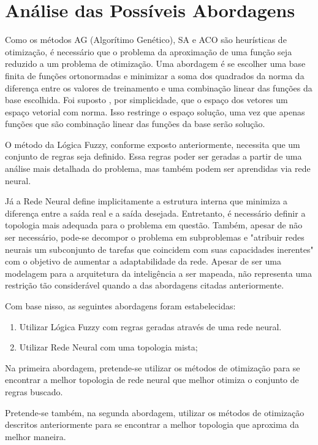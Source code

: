 \chapter{Análise das Possíveis Abordagens}

Como os métodos AG (Algorítimo Genético),
SA e ACO são heurísticas de otimização, é necessário que o problema da aproximação
de uma função seja reduzido a um problema de otimização. Uma abordagem é se escolher uma
base finita de funções ortonormadas e minimizar a soma dos quadrados da norma da diferença
entre os valores de treinamento e uma combinação linear das funções da base escolhida. Foi suposto
, por simplicidade, que o espaço dos vetores um espaço vetorial com norma. Isso restringe o
espaço solução, uma vez que apenas funções que são combinação linear das funções da base serão solução.

O método da Lógica Fuzzy, conforme exposto anteriormente, necessita que um conjunto de regras seja definido.
Essa regras poder ser geradas a partir de uma análise mais detalhada do problema, mas também podem ser 
aprendidas via rede neural.

Já a Rede Neural define implicitamente a estrutura interna
que minimiza a diferença entre a saída real e a saída desejada.
Entretanto, é necessário definir a topologia mais adequada para o
problema em questão. Também, apesar de não ser necessário, pode-se
decompor o problema em subproblemas e "atribuir redes neurais um
subconjunto de tarefas que coincidem com suas capacidades
inerentes" \cite[pag. 29]{haykin2001redes} com o objetivo de aumentar a
adaptabilidade da rede. Apesar de ser uma modelagem para a arquitetura
da inteligência a ser mapeada, não representa uma restrição tão
considerável quando a das abordagens citadas anteriormente.

Com base nisso, as seguintes abordagens foram estabelecidas:

\begin{enumerate}
 \item Utilizar Lógica Fuzzy com regras geradas através de uma rede neural.
 \item Utilizar Rede Neural com uma topologia mista;
\end{enumerate}

Na primeira abordagem, pretende-se utilizar os métodos de otimização para se
encontrar a melhor topologia de rede neural que melhor otimiza o conjunto de
regras buscado.

Pretende-se também, na segunda abordagem, utilizar os métodos de otimização
descritos anteriormente para se encontrar a melhor topologia que aproxima da
melhor maneira.
